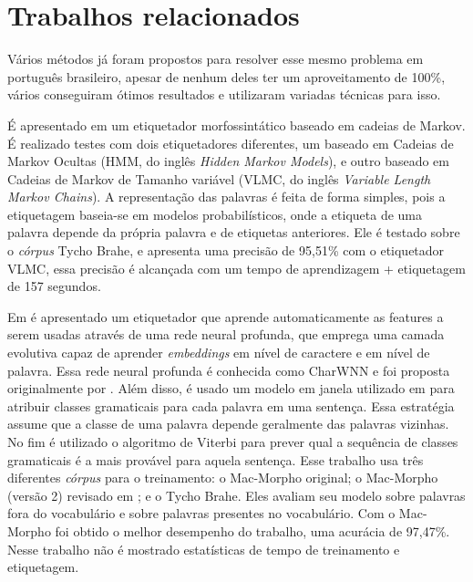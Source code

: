 \chapter{Trabalhos relacionados}\label{trabalhosrelacionados}

Vários métodos já foram propostos para resolver esse mesmo problema em português brasileiro, apesar de nenhum deles ter um aproveitamento de 100\%, vários conseguiram ótimos resultados e utilizaram variadas técnicas para isso.

É apresentado em \cite{kepler2005etiquetador} um etiquetador morfossintático baseado em cadeias de Markov. É realizado testes com dois etiquetadores diferentes, um baseado em Cadeias de Markov Ocultas (HMM, do inglês \textit{Hidden Markov Models}), e outro baseado em Cadeias de Markov de Tamanho variável (VLMC, do inglês \textit{Variable Length Markov Chains}). A representação das palavras é feita de forma simples, pois a etiquetagem baseia-se em modelos probabilísticos, onde a etiqueta de uma palavra depende da própria palavra e de etiquetas anteriores. Ele é testado sobre o \textit{córpus} Tycho Brahe, e apresenta uma precisão de 95,51\% com o etiquetador VLMC, essa precisão é alcançada com um tempo de aprendizagem + etiquetagem de 157 segundos. 

Em \cite{dos2014training} é apresentado um etiquetador que aprende automaticamente as features a serem usadas através de uma rede neural profunda, que emprega uma camada evolutiva capaz de aprender \textit{embeddings} em nível de caractere e em nível de palavra. Essa rede neural profunda é conhecida como CharWNN e foi proposta originalmente por . Além disso, é usado um modelo em janela utilizado em \cite{collobert2011natural} para atribuir classes gramaticais para cada palavra em uma sentença. Essa estratégia assume que a classe de uma palavra depende geralmente das palavras vizinhas. No fim é utilizado o algoritmo de Viterbi \cite{viterbi1967error} para prever qual a sequência de classes gramaticais é a mais provável para aquela sentença. Esse trabalho usa três diferentes \textit{córpus} para o treinamento: o Mac-Morpho original; o Mac-Morpho (versão 2) revisado em \cite{fonseca2013mac}; e o Tycho Brahe. Eles avaliam seu modelo sobre palavras fora do vocabulário e sobre palavras presentes no vocabulário. Com o Mac-Morpho foi obtido o melhor desempenho do trabalho, uma acurácia de 97,47\%. Nesse trabalho não é mostrado estatísticas de tempo de treinamento e etiquetagem.

